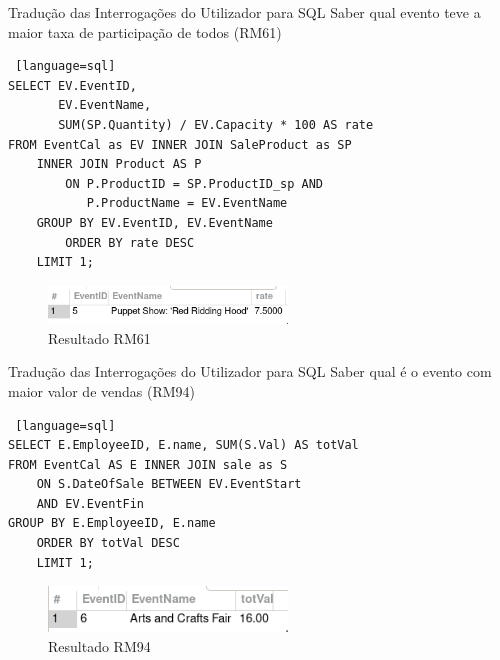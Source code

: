 \documentclass[compress,svgnames,handout,13.7pt]{beamer}
\begin{document}
\begin{frame}[fragile]{Tradu\c{c}\~{a}o das  Interroga\c{c}\~{o}es do Utilizador para SQL}
Saber qual evento teve a maior taxa de participação de todos (RM61)
\begin{lstlisting} [language=sql]
SELECT EV.EventID, 
       EV.EventName, 
       SUM(SP.Quantity) / EV.Capacity * 100 AS rate
FROM EventCal as EV INNER JOIN SaleProduct as SP
    INNER JOIN Product AS P
        ON P.ProductID = SP.ProductID_sp AND
           P.ProductName = EV.EventName
    GROUP BY EV.EventID, EV.EventName
        ORDER BY rate DESC
    LIMIT 1;
    \end{lstlisting}
    \begin{figure}[H]
            \centering
            \includegraphics[width=2.5in]{images/querie1.png}
            \caption{Resultado RM61}
    \end{figure}
\end{frame}

\begin{frame}[fragile]{Tradu\c{c}\~{a}o das  Interroga\c{c}\~{o}es do Utilizador para SQL}
Saber qual é o evento com maior valor de vendas (RM94)
\begin{lstlisting} [language=sql]
SELECT E.EmployeeID, E.name, SUM(S.Val) AS totVal
FROM EventCal AS E INNER JOIN sale as S
    ON S.DateOfSale BETWEEN EV.EventStart
    AND EV.EventFin
GROUP BY E.EmployeeID, E.name
    ORDER BY totVal DESC
    LIMIT 1;
    \end{lstlisting}
    \begin{figure}[H]
            \centering
            \includegraphics[width=2.5in]{images/querie2.png}
            \caption{Resultado RM94}
    \end{figure}
\end{frame}
\end{document}
